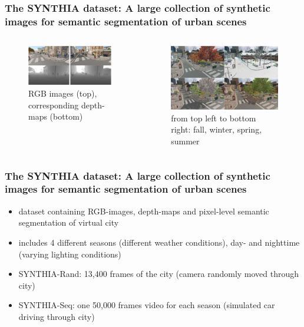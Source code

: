 \documentclass{beamer}
\begin{document}
\begin{frame}
\frametitle{The SYNTHIA dataset: A large collection of synthetic images for semantic segmentation of urban scenes}
\cite{synthia}
\begin{columns}[c]
\begin{figure}
	\includegraphics[width=\linewidth]{../images/SYNTHIA_depth_half.png}
	\caption{RGB images (top), corresponding depth-maps (bottom)}
\end{figure}
\begin{figure}
	\includegraphics[width=\linewidth]{../images/SYNTHIA_seasons.png}
	\caption{from top left to bottom right: fall, winter, spring, summer}
\end{figure}
\end{columns}
\end{frame}

\begin{frame}
\frametitle{The SYNTHIA dataset: A large collection of synthetic images for semantic segmentation of urban scenes}

\begin{itemize}
	\item dataset containing RGB-images, depth-maps and pixel-level semantic segmentation of virtual city
	\item includes 4 different seasons (different weather conditions), day- and nighttime (varying lighting conditions)
	\item SYNTHIA-Rand: 13,400 frames of the city (camera randomly moved through city)
	\item SYNTHIA-Seq: one 50,000 frames video for each season (simulated car driving through city)
\end{itemize}

\end{frame}
\end{document}

